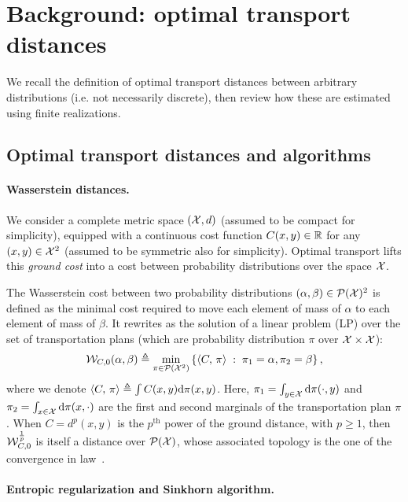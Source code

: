 \section{Background: optimal transport distances}

We recall the definition of optimal transport distances between arbitrary distributions (i.e. not necessarily discrete), then review how these are estimated using finite realizations.

\subsection{Optimal transport distances and algorithms}

\paragraph{Wasserstein distances.} 

We consider a complete metric space $(\mathcal{X},d)$ (assumed to be compact for simplicity), equipped
with a continuous cost function $C(x,y) \in \mathbb{R}$ for any $(x,y) \in \mathcal{X}^2$ (assumed to be symmetric also for simplicity). 
%
Optimal transport lifts this \textit{ground cost} into a cost between probability
distributions over the space $\mathcal{X}$. 
%

The Wasserstein cost between two probability distributions $(\alpha, \beta) \in \mathcal{P}(\mathcal{X})^2$ is defined as the minimal cost required to move each element of mass of $\alpha$ to each element of mass of $\beta$. It rewrites as the solution of a
linear problem (LP) over the set of transportation plans (which are probability distribution $\pi$ over $\mathcal{X} \times \mathcal{X}$):
\begin{equation}\label{eq:wass_0}
    \mathcal{W}_{C,0}(\alpha, \beta) \triangleq 
    \min_{\pi \in \mathcal{P}(\mathcal{X}^2)}
    \left\{ 
    	\langle C,\,\pi\rangle
	 \;:\;  \pi_1=\alpha, \pi_2=\beta \right\},
\end{equation}
where we denote $\langle C,\,\pi\rangle \triangleq \int C(x,y) \textrm{d}\pi(x,y)$. Here,  
$\pi_1 = \int_{y\in \mathcal{X}} \textrm{d} \pi(\cdot, y)$ and $\pi_2 = \int_{x\in \mathcal{X}} \textrm{d}
\pi(x, \cdot)$ are the first and second marginals of the transportation plan $\pi$. 
%
When $C=d^p(x,y)$ is the $p^{\text{th}}$ power of the ground distance, with $p
\geq 1$, then $\mathcal{W}_{C,0}^{\frac{1}{p}}$ is itself a distance over $\mathcal{P}(\mathcal{X})$, whose
associated topology is the one of the convergence in
law~\citep{santambrogio2015optimal}.

\paragraph{Entropic regularization and Sinkhorn algorithm.} 

